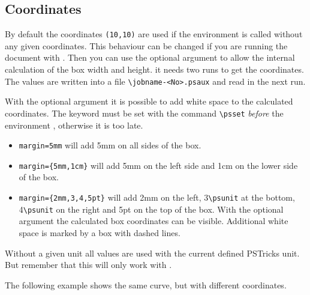 \documentclass[11pt,english,BCOR=10mm,DIV=12,bibliography=totoc,parskip=false,headings=small,
    headinclude=false,footinclude=false,twoside,usegeometry,dvipsnames]{pst-doc}
\def\Lcs#1{\texttt{\textbackslash#1}}
\begin{document}
\subsection{Coordinates}
By default the coordinates \verb|(10,10)| are used if the environment 
is called without any given coordinates. This behaviour can be changed if you are running
the document with . Then you can use the optional argument 
to allow the internal calculation of the box width and height. it needs two 
runs to get the coordinates. The values are written into a file \verb|\jobname-<No>.psaux| and read
in the next run.

With the optional argument  it is possible to add white space to the calculated coordinates.
The keyword must be set with the command \Lcs{psset} \emph{before} the environment , otherwise it is too late.

\begin{itemize}
\item \verb|margin=5mm| will add 5mm on all sides of the box.
\item \verb|margin={5mm,1cm}| will add 5mm on the left side and 1cm on the lower side of the box.
\item \verb|margin={2mm,3,4,5pt}| will add 2mm on the left, 3\Lcs{psunit} at the bottom, 4\Lcs{psunit} on
the right and 5pt on the top of the box. With the optional argument  the calculated
box coordinates can be visible. Additional white space is marked by a box with dashed lines.
\end{itemize}

Without a given unit all values are used with the current defined PSTricks unit. But remember
that this will only work with .

The following example shows the same curve, but with different coordinates.
\end{document}
